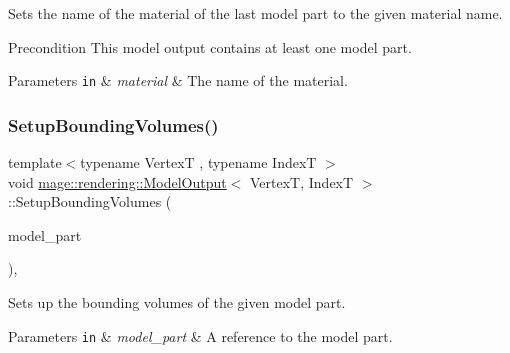 Sets the name of the material of the last model part to the given material name.

\begin{DoxyPrecond}{Precondition}
This model output contains at least one model part. 
\end{DoxyPrecond}

\begin{DoxyParams}[1]{Parameters}
\mbox{\tt in}  & {\em material} & The name of the material. \\
\hline
\end{DoxyParams}
\hypertarget{structmage_1_1rendering_1_1_model_output_a4b00228713e34d955cb5104c8592f7a0}{}\label{structmage_1_1rendering_1_1_model_output_a4b00228713e34d955cb5104c8592f7a0} 
\subsubsection{\texorpdfstring{Setup\+Bounding\+Volumes()}{SetupBoundingVolumes()}}
{\footnotesize\ttfamily template$<$typename VertexT , typename IndexT $>$ \\
void \hyperlink{structmage_1_1rendering_1_1_model_output}{mage\+::rendering\+::\+Model\+Output}$<$ VertexT, IndexT $>$\+::Setup\+Bounding\+Volumes (\begin{DoxyParamCaption}\item[{\hyperlink{structmage_1_1rendering_1_1_model_part}{Model\+Part} \&}]{model\+\_\+part }\end{DoxyParamCaption})\hspace{0.3cm}{\ttfamily [private]}, {\ttfamily [noexcept]}}

Sets up the bounding volumes of the given model part.


\begin{DoxyParams}[1]{Parameters}
\mbox{\tt in}  & {\em model\+\_\+part} & A reference to the model part. \\
\hline
\end{DoxyParams}
\hypertarget{structmage_1_1rendering_1_1_model_output_adc21b44bf476fa7704f97403c1539eb9}{}\label{structmage_1_1rendering_1_1_model_output_adc21b44bf476fa7704f97403c1539eb9} 
